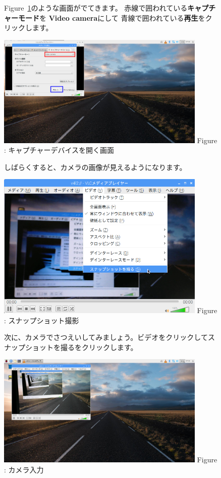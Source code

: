 \documentclass[a4paper,12pt]{jarticle}
\begin{document}
\begin{figure}[ht]
  Figure~\ref{seq:refFigure23}のような画面がでてきます。
  赤線で囲われている\textbf{キャプチャーモード}を
  \textbf{Video camera}にして
  青線で囲われている\textbf{再生}をクリックします。


  \centering
  \begin{minipage}{10cm}
    \includegraphics[width=10cm]{textbook-img117.png}
    Figure {\theFigure\label{seq:refFigure23}}:
    キャプチャーデバイスを開く画面
  \end{minipage}

  \flushleft
  しばらくすると、カメラの画像が見えるようになります。

  \centering
  \begin{minipage}{10cm}
    {\upshape
      \includegraphics[width=10cm]{textbook-img118.png}
      \newline
      Figure : スナップショット撮影}
  \end{minipage}
  \flushleft

  次に、カメラでさつえいしてみましょう。ビデオをクリックしてスナップショットを撮るをクリックします。


  \centering
  \begin{minipage}{10cm}
    \includegraphics[width=10cm]{textbook-img119.png}
    {\upshape
      Figure : カメラ入力}
  \end{minipage}
\end{figure}
\end{document}
